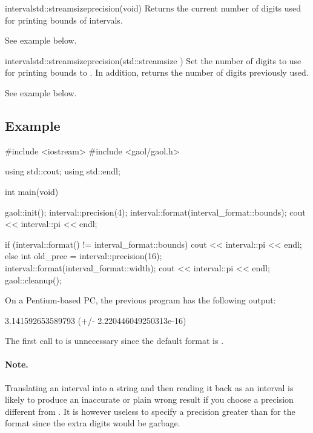 \documentclass{manual}
\begin{document}
\begin{defmethod}{interval}{std::streamsize}{precision}{(void)}
Returns the current number of digits used for printing bounds
of intervals.

See example below.
\end{defmethod}

\begin{defmethod}{interval}{std::streamsize}{precision}{(std::streamsize )}
Set the number of digits to use for printing bounds to . In addition,
returns the number of digits previously used.

See example below.
\end{defmethod}


\subsection{Example}\label{sec:output-example}

\begin{example}
#include <iostream>
#include <gaol/gaol.h>

using std::cout;
using std::endl;

int main(void)
{
  gaol::init();
  interval::precision(4);
  interval::format(interval_format::bounds);
  cout << interval::pi << endl;

  if (interval::format() != interval_format::bounds) {
    cout << interval::pi << endl;
  } else {
    int old_prec = interval::precision(16);
    interval::format(interval_format::width);
    cout << interval::pi << endl;
  }
  gaol::cleanup();
}
\end{example}

\noindent
On a Pentium-based PC, the previous program has the following output:

\begin{onscreen}
[ 3.142, 3.142 ]
3.141592653589793 (+/- 2.220446049250313e-16)
\end{onscreen}

The first call to  is unnecessary
since the default format is .

\paragraph*{Note.} Translating an interval into a string and then reading it back
as an interval is likely to produce an inaccurate or plain wrong result if you
choose a precision different from . It is however useless to specify a
precision greater than  for the  format since the extra
digits would be garbage.
\end{document}
